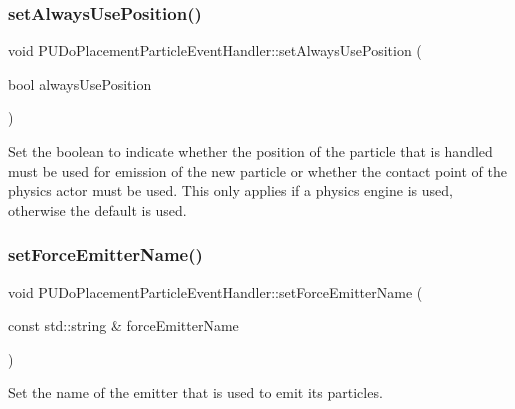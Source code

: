 \subsubsection{\texorpdfstring{set\+Always\+Use\+Position()}{setAlwaysUsePosition()}\hspace{0.1cm}{\footnotesize\ttfamily [2/2]}}
{\footnotesize\ttfamily void P\+U\+Do\+Placement\+Particle\+Event\+Handler\+::set\+Always\+Use\+Position (\begin{DoxyParamCaption}\item[{bool}]{always\+Use\+Position }\end{DoxyParamCaption})\hspace{0.3cm}{\ttfamily [inline]}}

Set the boolean to indicate whether the position of the particle that is handled must be used for emission of the new particle or whether the contact point of the physics actor must be used. This only applies if a physics engine is used, otherwise the default is used. \mbox{\label{classPUDoPlacementParticleEventHandler_a3f2f070e0ebaeb4f15f8f8f9bf4c8237}} 
\subsubsection{\texorpdfstring{set\+Force\+Emitter\+Name()}{setForceEmitterName()}\hspace{0.1cm}{\footnotesize\ttfamily [1/2]}}
{\footnotesize\ttfamily void P\+U\+Do\+Placement\+Particle\+Event\+Handler\+::set\+Force\+Emitter\+Name (\begin{DoxyParamCaption}\item[{const std\+::string \&}]{force\+Emitter\+Name }\end{DoxyParamCaption})}

Set the name of the emitter that is used to emit its particles. \mbox{\label{classPUDoPlacementParticleEventHandler_a3f2f070e0ebaeb4f15f8f8f9bf4c8237}} 
